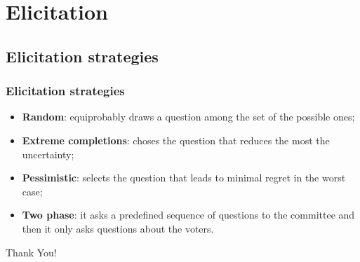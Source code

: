 \documentclass{beamer}
\begin{document}
\section{Elicitation}
	
	\subsection{Elicitation strategies}
	\begin{frame}
		\frametitle{Elicitation strategies}
		\begin{itemize}
			 \item \textbf{Random}: equiprobably draws a question among the set of the possible ones;
			
			 \item \textbf{Extreme completions}: choses the question that reduces the most the uncertainty;
			
			 \item \textbf{Pessimistic}: selects the question that leads to minimal regret in the worst case; 
			
			 \item \textbf{Two phase}: it asks a predefined sequence of questions to the committee and then it only asks questions about the voters.
		\end{itemize}
		\bigskip
	\end{frame}


\addtocounter{framenumber}{-1}
\begin{frame}[plain]
	\centering \color{darkred}\LARGE Thank You!
\end{frame}





 


\end{document}
